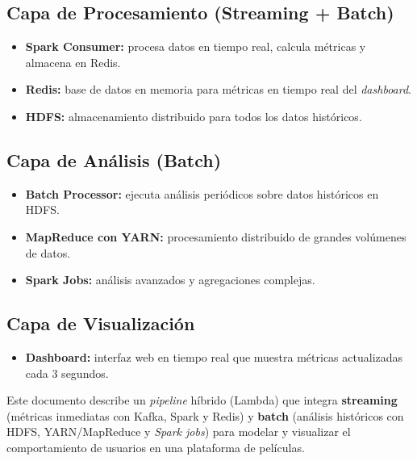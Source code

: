 \documentclass[11pt,a4paper]{article}
\begin{document}
\subsection*{Capa de Procesamiento (Streaming + Batch)}
\begin{itemize}
  \item \textbf{Spark Consumer:} procesa datos en tiempo real, calcula métricas y almacena en Redis.
  \item \textbf{Redis:} base de datos en memoria para métricas en tiempo real del \textit{dashboard}.
  \item \textbf{HDFS:} almacenamiento distribuido para todos los datos históricos.
\end{itemize}

\subsection*{Capa de Análisis (Batch)}
\begin{itemize}
  \item \textbf{Batch Processor:} ejecuta análisis periódicos sobre datos históricos en HDFS.
  \item \textbf{MapReduce con YARN:} procesamiento distribuido de grandes volúmenes de datos.
  \item \textbf{Spark Jobs:} análisis avanzados y agregaciones complejas.
\end{itemize}

\subsection*{Capa de Visualización}
\begin{itemize}
  \item \textbf{Dashboard:} interfaz web en tiempo real que muestra métricas actualizadas cada 3 segundos.
\end{itemize}

\vfill
\begin{tcolorbox}[colback=accent!5,colframe=accent,title=Resumen]
Este documento describe un \textit{pipeline} híbrido (Lambda) que integra \textbf{streaming} (métricas inmediatas con Kafka, Spark y Redis) y \textbf{batch} (análisis históricos con HDFS, YARN/MapReduce y \textit{Spark jobs}) para modelar y visualizar el comportamiento de usuarios en una plataforma de películas.
\end{tcolorbox}
\end{document}
